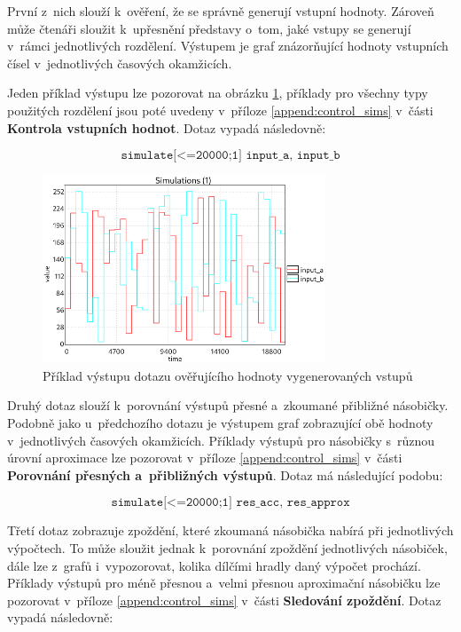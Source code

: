 První z~nich slouží k~ověření, že se správně generují vstupní hodnoty. Zároveň může čtenáři sloužit k~upřesnění představy o~tom, jaké vstupy se generují v~rámci jednotlivých rozdělení. Výstupem je graf znázorňující hodnoty vstupních čísel v~jednotlivých časových okamžicích. 

Jeden příklad výstupu lze pozorovat na obrázku \ref{fig:input_sim_example}, příklady pro všechny typy použitých rozdělení jsou poté uvedeny v~příloze \ref{append:control_sims} v~části \textbf{Kontrola vstupních hodnot}. Dotaz vypadá následovně:

\begin{equation*}
    \texttt{simulate[<=20000;1] {input\_a, input\_b}}
\end{equation*}

\begin{figure}[H]
    \centering
    \includegraphics[width=0.75\textwidth]{obrazky-figures/inputs_uni_uni.png}
    \caption{Příklad výstupu dotazu ověřujícího hodnoty vygenerovaných vstupů}
    \label{fig:input_sim_example}
\end{figure}

Druhý dotaz slouží k~porovnání výstupů přesné a~zkoumané přibližné násobičky. Podobně jako u~předchozího dotazu je výstupem graf zobrazující obě hodnoty v~jednotlivých časových okamžicích. Příklady výstupů pro násobičky s~různou úrovní aproximace lze pozorovat v~příloze \ref{append:control_sims} v~části \textbf{Porovnání přesných a~přibližných výstupů}. Dotaz má následující podobu:

\begin{equation*}
    \texttt{simulate[<=20000;1] {res\_acc, res\_approx}}
\end{equation*}

Třetí dotaz zobrazuje zpoždění, které zkoumaná násobička nabírá při jednotlivých výpočtech. To může sloužit jednak k~porovnání zpoždění jednotlivých násobiček, dále lze z~grafů i~vypozorovat, kolika dílčími hradly daný výpočet prochází. Příklady výstupů pro méně přesnou a~velmi přesnou aproximační násobičku lze pozorovat v~příloze \ref{append:control_sims} v~části \textbf{Sledování zpoždění}. Dotaz vypadá následovně:

